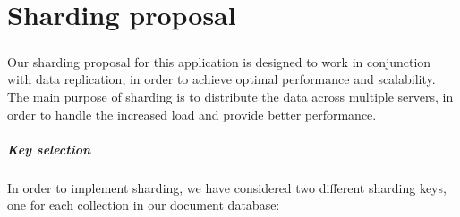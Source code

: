 %
%
%	
%

\chapter{Sharding proposal}

\paragraph{}
Our sharding proposal for this application is designed to work in conjunction with data replication, in order to achieve optimal performance and scalability. The main purpose of sharding is to distribute the data across multiple servers, in order to handle the increased load and provide better performance.

\paragraph{Key selection}
In order to implement sharding, we have considered two different sharding keys, one for each collection in our document database:

